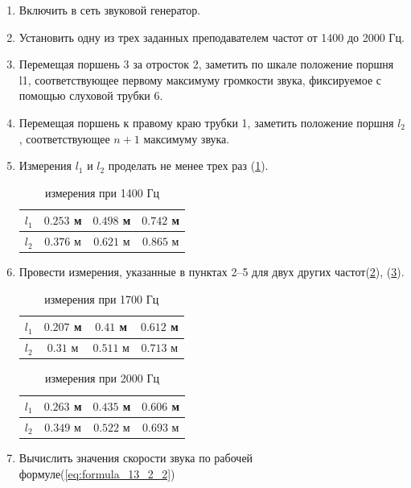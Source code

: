 \begin{enumerate}
    \item{Включить в сеть звуковой генератор.}
    \item{Установить одну из трех заданных преподавателем частот от 1400 до 2000 Гц.}
    \item{Перемещая поршень 3 за отросток 2, заметить по шкале положение поршня l1, соответствующее первому максимуму громкости звука, фиксируемое с помощью слуховой трубки 6.}
    \item{Перемещая поршень к правому краю трубки 1, заметить положение поршня $l_2$, соответствующее $n+1$ максимуму звука.}
    \item{Измерения $l_1$ и $l_2$ проделать не менее трех раз (\ref{tab:1400_гц_table}).

            \begin{table}[h!]
                \centering
                \begin{tabular}{|c|c|c|c|}
                    \hline
                    $l_1$ & $0.253$ м & $0.498$ м & $0.742$ м \\
                    \hline
                    $l_2$ & $0.376$ м & $0.621$ м & $0.865$ м \\
                    \hline
                \end{tabular}
                \caption{измерения при 1400 Гц}
                \label{tab:1400_гц_table}
            \end{table}
        }
    \item{Провести измерения, указанные в пунктах 2--5 для двух других частот(\ref{tab:1700_гц_table}), (\ref{tab:2000_гц_table}).

            \begin{table}[h!]
                \centering
                \begin{tabular}{|c|c|c|c|}
                    \hline
                    $l_1$ & $0.207$ м & $0.41$ м & $0.612$ м \\
                    \hline
                    $l_2$ & $0.31$ м & $0.511$ м & $0.713$ м \\
                    \hline
                \end{tabular}
                \caption{измерения при 1700 Гц}
                \label{tab:1700_гц_table}
            \end{table}

            \begin{table}[h!]
                \centering
                \begin{tabular}{|c|c|c|c|}
                    \hline
                    $l_1$ & $0.263$ м & $0.435$ м & $0.606$ м \\
                    \hline
                    $l_2$ & $0.349$ м & $0.522$ м & $0.693$ м \\
                    \hline
                \end{tabular}
                \caption{измерения при 2000 Гц}
                \label{tab:2000_гц_table}
            \end{table}
        }
    \item{Вычислить значения скорости звука по рабочей формуле(\ref{eq:formula_13_2_2})

}
\end{enumerate}
